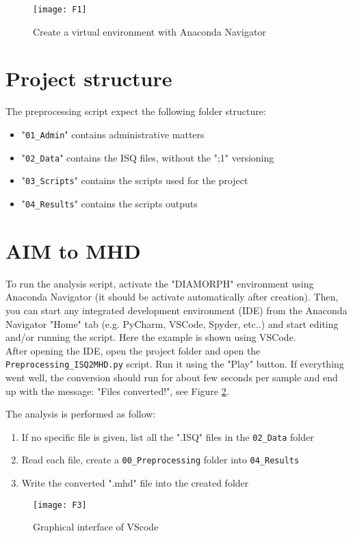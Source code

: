 \documentclass{article}
\begin{document}
	\begin{figure}[h!]
		\centering
		\texttt{[image: F1]}
		\caption{Create a virtual environment with Anaconda Navigator}
		\label{F1}
	\end{figure}
	
	\section{Project structure}

	The preprocessing script expect the following folder structure:
	
	\begin{itemize}
		\item "\texttt{01\_Admin}" contains administrative matters
		\item "\texttt{02\_Data}" contains the ISQ files, without the ";1" versioning
		\item "\texttt{03\_Scripts}" contains the scripts used for the project
		\item "\texttt{04\_Results}" contains the scripts outputs
	\end{itemize}
	
	\section{AIM to MHD}
	To run the analysis script, activate the "DIAMORPH" environment using Anaconda Navigator (it should be activate automatically after creation). Then, you can start any integrated development environment (IDE) from the Anaconda Navigator "Home" tab (e.g. PyCharm, VSCode, Spyder, etc..) and start editing and/or running the script. Here the example is shown using VSCode.\\[1ex]
	
	After opening the IDE, open the project folder and open the  \texttt{Preprocessing\_ISQ2MHD.py} script. Run it using the "Play" button. If everything went well, the conversion should run for about few seconds per sample and end up with the message: "Files converted!", see Figure \ref{F3}.
	
	The analysis is performed as follow:
	\begin{enumerate}
		\item If no specific file is given, list all the ".ISQ" files in the \texttt{02\_Data} folder
		\item Read each file, create a \texttt{00\_Preprocessing} folder into \texttt{04\_Results}
		\item Write the converted ".mhd" file into the created folder
	\end{enumerate}

	\begin{figure}[h!]
		\centering
		\texttt{[image: F3]}
		\caption{Graphical interface of VScode}
		\label{F3}
	\end{figure}
\end{document}
